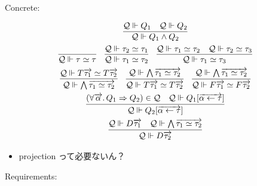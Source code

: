 Concrete:

\begin{gather*}
  \infer{\mathcal{Q} \Vdash Q_1 \land Q_2}{
    \mathcal{Q} \Vdash Q_1
    &
    \mathcal{Q} \Vdash Q_2
  }
  \\
  \infer{\mathcal{Q} \Vdash \tau \simeq \tau}{}
  \hspace{1em}
  \infer{\mathcal{Q} \Vdash \tau_1 \simeq \tau_2}{
    \mathcal{Q} \Vdash \tau_2 \simeq \tau_1
  }
  \hspace{1em}
  \infer{\mathcal{Q} \Vdash \tau_1 \simeq \tau_3}{
    \mathcal{Q} \Vdash \tau_1 \simeq \tau_2
    &
    \mathcal{Q} \Vdash \tau_2 \simeq \tau_3
  }
  \\
  \infer{\mathcal{Q} \Vdash \bigwedge \overrightarrow{\tau_1 \simeq \tau_2}}{
    \mathcal{Q} \Vdash T\overrightarrow{\tau_1} \simeq T\overrightarrow{\tau_2}
  }
  \hspace{1em}
  \infer{\mathcal{Q} \Vdash T\overrightarrow{\tau_1} \simeq T\overrightarrow{\tau_2}}{
    \mathcal{Q} \Vdash \bigwedge \overrightarrow{\tau_1 \simeq \tau_2}
  }
  \hspace{1em}
  \infer{\mathcal{Q} \Vdash F\overrightarrow{\tau_1} \simeq F\overrightarrow{\tau_2}}{
    \mathcal{Q} \Vdash \bigwedge \overrightarrow{\tau_1 \simeq \tau_2}
  }
  \\
  \infer{\mathcal{Q} \Vdash Q_2[\overrightarrow{\alpha \assign \tau}]}{
    (\forall \overrightarrow{\alpha}\ldotp Q_1 \Rightarrow Q_2) \in \mathcal{Q}
    &
    \mathcal{Q} \Vdash Q_1[\overrightarrow{\alpha \assign \tau}]
  }
  \\
  \infer{\mathcal{Q} \Vdash D \overrightarrow{\tau_2}}{
    \mathcal{Q} \Vdash D \overrightarrow{\tau_1}
    &
    \mathcal{Q} \Vdash \bigwedge \overrightarrow{\tau_1 \simeq \tau_2}
  }
\end{gather*}

\begin{itemize}
  \item projection って必要ないん？
\end{itemize}

Requirements:

